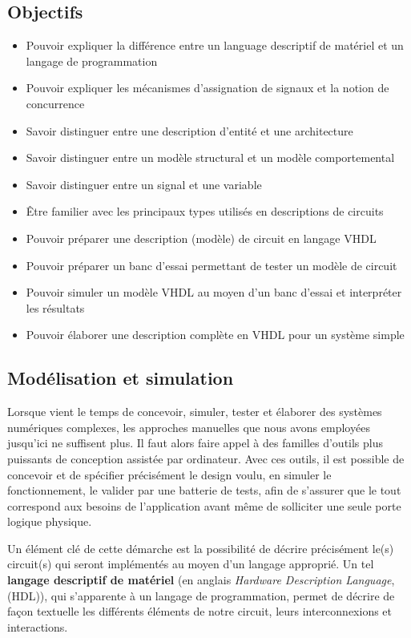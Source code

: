 \documentclass[11pt]{article}
\begin{document}
\subsection{Objectifs}
\label{sec:orgec11293}
\begin{itemize}
\item Pouvoir expliquer la différence entre un language descriptif de
matériel et un langage de programmation
\item Pouvoir expliquer les mécanismes d'assignation de signaux et la notion de concurrence
\item Savoir distinguer entre une description d'entité et une architecture
\item Savoir distinguer entre un modèle structural et un modèle
comportemental
\item Savoir distinguer entre un signal et une variable
\item Être familier avec les principaux types utilisés en descriptions
de circuits
\item Pouvoir préparer une description (modèle) de circuit en langage VHDL
\item Pouvoir préparer un banc d'essai permettant de tester un modèle de circuit
\item Pouvoir simuler un modèle VHDL au moyen d'un banc d'essai et
interpréter les résultats
\item Pouvoir élaborer une description complète en VHDL pour un système simple
\end{itemize}


\subsection{Modélisation et simulation}
\label{sec:org079e5b6}

Lorsque vient le temps de concevoir, simuler, tester et élaborer des
systèmes numériques complexes, les approches manuelles que nous avons
employées jusqu'ici ne suffisent plus. Il faut alors faire appel à des
familles d'outils plus puissants de conception assistée par
ordinateur. Avec ces outils, il est possible de concevoir et de
spécifier précisément le design voulu, en simuler le fonctionnement,
le valider par une batterie de tests, afin de s'assurer que le tout
correspond aux besoins de l'application avant même de solliciter une
seule porte logique physique.

Un élément clé de cette démarche est la possibilité de décrire
précisément le(s) circuit(s) qui seront implémentés au moyen d'un
langage approprié. Un tel \textbf{langage descriptif de matériel} (en anglais
\emph{Hardware Description Language}, (HDL)), qui s'apparente à un langage
de programmation, permet de décrire de façon textuelle les différents
éléments de notre circuit, leurs interconnexions et interactions.
\end{document}
